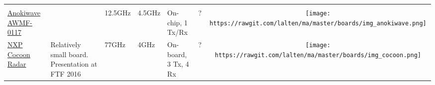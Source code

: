 \begin{longtable}[]{@{}llllllc@{}}
\begin{minipage}[t]{0.10\columnwidth}
\strut\end{minipage}\tabularnewline

\begin{minipage}[t]{0.09\columnwidth}\raggedright\strut
	\href{http://www.anokiwave.com/products/awmf-0117/index.html}{Anokiwave AWMF-0117}
\strut\end{minipage} &
\begin{minipage}[t]{0.13\columnwidth}\raggedright\strut

\strut\end{minipage} &
\begin{minipage}[t]{0.09\columnwidth}\raggedright\strut
12.5GHz
\strut\end{minipage} &
\begin{minipage}[t]{0.11\columnwidth}\raggedright\strut
4.5GHz
\strut\end{minipage} &
\begin{minipage}[t]{0.10\columnwidth}\raggedright\strut
On-chip, 1 Tx/Rx
\strut\end{minipage} &
\begin{minipage}[t]{0.15\columnwidth}\raggedright\strut
?
\strut\end{minipage} &
\begin{minipage}[t]{0.10\columnwidth}\centering\strut
\texttt{[image: https://rawgit.com/lalten/ma/master/boards/img\_anokiwave.png]}
\strut\end{minipage}\tabularnewline

\begin{minipage}[t]{0.09\columnwidth}\raggedright\strut
	\href{Reuter2016}{NXP Cocoon Radar}
\strut\end{minipage} &
\begin{minipage}[t]{0.13\columnwidth}\raggedright\strut
Relatively small board. Presentation at FTF 2016\cite{Reuter2016}
\strut\end{minipage} &
\begin{minipage}[t]{0.09\columnwidth}\raggedright\strut
77GHz
\strut\end{minipage} &
\begin{minipage}[t]{0.11\columnwidth}\raggedright\strut
4GHz
\strut\end{minipage} &
\begin{minipage}[t]{0.10\columnwidth}\raggedright\strut
On-board, 3 Tx, 4 Rx
\strut\end{minipage} &
\begin{minipage}[t]{0.15\columnwidth}\raggedright\strut
?
\strut\end{minipage} &
\begin{minipage}[t]{0.10\columnwidth}\centering\strut
\texttt{[image: https://rawgit.com/lalten/ma/master/boards/img\_cocoon.png]}
\strut\end{minipage}\tabularnewline


\end{longtable}
